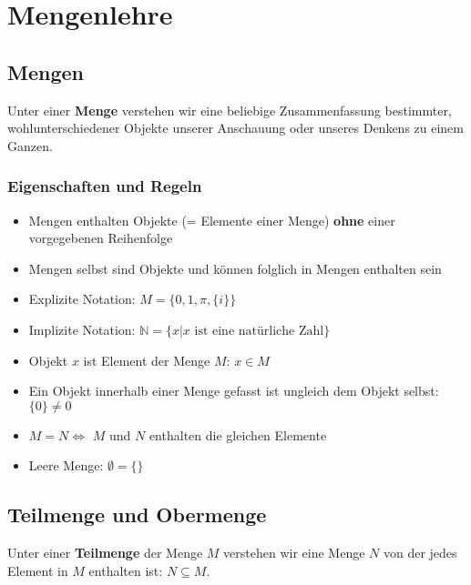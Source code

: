 \documentclass[../../main.tex]{subfiles}
\begin{document}
	\chapter{Mengenlehre}

	\section{Mengen}
	
	\begin{definition}[Menge]
		\label{def:Menge}
		Unter einer \textbf{Menge} verstehen wir eine beliebige Zusammenfassung bestimmter, wohlunterschiedener Objekte unserer Anschauung oder unseres Denkens zu einem Ganzen. 
	\end{definition}

	\subsection*{Eigenschaften und Regeln}
	\begin{itemize}
		\item Mengen enthalten Objekte (= Elemente einer Menge) \textbf{ohne} einer vorgegebenen Reihenfolge
		\item Mengen selbst sind Objekte und können folglich in Mengen enthalten sein
		\item Explizite Notation: $M = \{0, 1, \pi, \{i\}\}$
		\item Implizite Notation: $\mathbb{N} = \{x|x \textrm{ ist eine natürliche Zahl}\}$
		\item Objekt $x$ ist Element der Menge $M$: $x \in M$
		\item Ein Objekt innerhalb einer Menge gefasst ist ungleich dem Objekt selbst: $\{0\} \not= 0$
		\item $M = N \Leftrightarrow$ $M$ und $N$ enthalten die gleichen Elemente 
		\item Leere Menge: $\emptyset = \{\}$ 
	\end{itemize}



	\section{Teilmenge und Obermenge}

	\begin{definition}[Teilmenge]
		Unter einer \textbf{Teilmenge} der Menge $M$ verstehen wir eine Menge $N$ von der jedes Element in $M$ enthalten ist: $N \subseteq M$.
	\end{definition}
\end{document}

